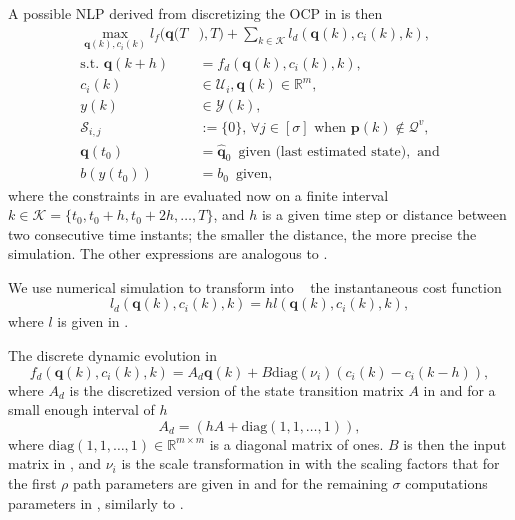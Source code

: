 A possible NLP derived from discretizing the OCP in  is then
\begin{subequations}\label{eq:disc-ocp-output-mpc}\begin{align}
  \max_{\mathbf{q}(k),c_i(k)}{l_f(\mathbf{q}(T}&{),T)+\sum_{k\in\mathcal{K}}{l_d(\mathbf{q}(k),c_i(k),k)}},\\
  \text{s.t. }\mathbf{q}(k+h)&=f_d(\mathbf{q}(k),c_i(k),k),\label{eq:disc-dyn-evol}\\
  c_i(k)&\in\mathcal{U}_i,\mathbf{q}(k)\in\mathbb{R}^m,\label{eq:disc-state-cont-const-mpc}\\
  y(k)&\in\mathcal{Y}(k),\label{eq:disc-batt-const-mpc}\\
  \mathcal{S}_{i,j}&:=\{0\},\,\forall j \in [\sigma]\text{ when }\mathbf{p}(k)\notin\mathcal{Q}^v,\label{eq:disc-polyg-const}\\
  \mathbf{q}(t_0)&=\hat{\mathbf{q}}_0\,\,\,\text{given (last estimated state)},\text{ and}\\
  b(y(t_0))&=b_0\,\,\,\text{given},
\end{align}\end{subequations}
where the constraints in  are evaluated now on a finite interval $k\in\mathcal{K}=\{t_0,t_0+h,t_0+2h,\dots,T\}$, and $h$ is a given time step or distance between two  consecutive time instants; the smaller the distance, the more precise the simulation. The other expressions are analogous to .

We use numerical simulation to transform  into ~\citep{iserles2009first} 
the instantaneous cost function
\begin{equation}\label{eq:mpc-cost-euler}
  l_d(\mathbf{q}(k),c_i(k),k)=hl(\mathbf{q}(k),c_i(k),k),
\end{equation}
where $l$ is given in .

The discrete dynamic evolution in 
\begin{equation}\label{eq:nlp-discr-dyn}
  f_d(\mathbf{q}(k),c_i(k),k)=A_d\mathbf{q}(k)+B\mathrm{diag}(\nu_i)(c_i(k)-c_i(k-h)),
\end{equation}
where $A_d$ is the discretized version of the state transition matrix $A$ in  and for a small enough interval of $h$
\begin{equation}
A_d=(hA+\mathrm{diag}(1,1,\dots,1)),
\end{equation}
where $\mathrm{diag}(1,1,\dots,1)\in\mathbb{R}^{m\times m}$ is a diagonal matrix of ones. $B$ is then the input matrix in , and $\nu_i$ is the scale transformation in  with the scaling factors that for the first $\rho$ path parameters are given in  and for the remaining $\sigma$ computations parameters in , similarly to .

